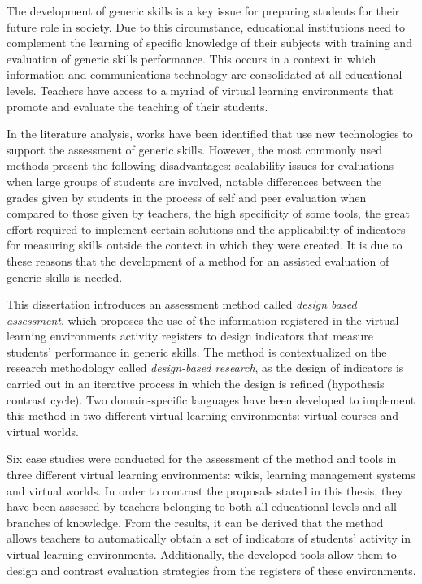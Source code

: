 \begin{abstracts}        %

The development of generic skills is a key issue for preparing students for their future role in society. Due to this circumstance, educational institutions need to complement the learning of specific knowledge of their subjects with training and evaluation of generic skills performance. This occurs in a context in which information and communications technology are consolidated at all educational levels. Teachers have access to a myriad of virtual learning environments that promote and evaluate the teaching of their students.

In the literature analysis, works have been identified that use new technologies to support the assessment of generic skills. However, the most commonly used methods present the following disadvantages: scalability issues for evaluations when large groups of students are involved, notable differences between the grades given by students in the process of self and peer evaluation when compared to those given by teachers, the high specificity of some tools, the great effort required to implement certain solutions and the applicability of indicators for measuring skills outside the context in which they were created. It is due to these reasons that the development of a method for an assisted evaluation of generic skills is needed.

This dissertation introduces an assessment method called \emph{design based assessment}, which proposes the use of the information registered in the virtual learning environments activity registers to design indicators that measure students’ performance in generic skills. The method is contextualized on the research methodology called  \emph{design-based research}, as the design of indicators is carried out in an iterative process in which the design is refined (hypothesis contrast cycle). Two domain-specific languages have been developed to implement this method in two different virtual learning environments: virtual courses and virtual worlds.

Six case studies were conducted for the assessment of the method and tools in three different virtual learning environments: wikis, learning management systems and virtual worlds. In order to contrast the proposals stated in this thesis, they have been assessed by teachers belonging to both all educational levels and all branches of knowledge. From the results, it can be derived that the method allows teachers to automatically obtain a set of indicators of students’ activity in virtual learning environments. Additionally, the developed tools allow them to design and contrast evaluation strategies from the registers of these environments. 


\end{abstracts}






